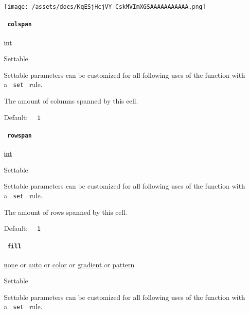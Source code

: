 \texttt{[image: /assets/docs/KqESjHcjVY-CskMVImXGSAAAAAAAAAAA.png]}

\paragraph{\texorpdfstring{\texttt{\ colspan\ }}{ colspan }}\label{definitions-cell-colspan}

\href{/docs/reference/foundations/int/}{int}

{{ Settable }}

\label{definitions-cell-colspan-settable-tooltip}
Settable parameters can be customized for all following uses of the
function with a \texttt{\ set\ } rule.

The amount of columns spanned by this cell.

Default: \texttt{\ }{\texttt{\ 1\ }}\texttt{\ }

\paragraph{\texorpdfstring{\texttt{\ rowspan\ }}{ rowspan }}\label{definitions-cell-rowspan}

\href{/docs/reference/foundations/int/}{int}

{{ Settable }}

\label{definitions-cell-rowspan-settable-tooltip}
Settable parameters can be customized for all following uses of the
function with a \texttt{\ set\ } rule.

The amount of rows spanned by this cell.

Default: \texttt{\ }{\texttt{\ 1\ }}\texttt{\ }

\paragraph{\texorpdfstring{\texttt{\ fill\ }}{ fill }}\label{definitions-cell-fill}

\href{/docs/reference/foundations/none/}{none} {or}
\href{/docs/reference/foundations/auto/}{auto} {or}
\href{/docs/reference/visualize/color/}{color} {or}
\href{/docs/reference/visualize/gradient/}{gradient} {or}
\href{/docs/reference/visualize/pattern/}{pattern}

{{ Settable }}

\label{definitions-cell-fill-settable-tooltip}
Settable parameters can be customized for all following uses of the
function with a \texttt{\ set\ } rule.


